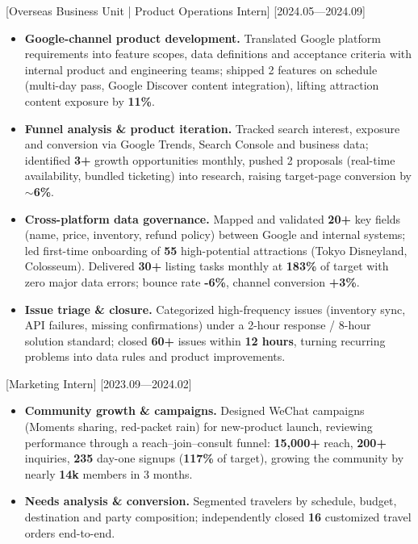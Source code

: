 \documentclass{resume}
\begin{document}
[\textnormal{Overseas Business Unit | Product Operations Intern}]
[2024.05—2024.09]

\begin{itemize}

\item \textbf{Google-channel product development.} Translated Google platform requirements into feature scopes, data definitions and acceptance criteria with internal product and engineering teams; shipped 2 features on schedule (multi-day pass, Google Discover content integration), lifting attraction content exposure by \textbf{11\%}.

\item \textbf{Funnel analysis \& product iteration.} Tracked search interest, exposure and conversion via Google Trends, Search Console and business data; identified \textbf{3+} growth opportunities monthly, pushed 2 proposals (real-time availability, bundled ticketing) into research, raising target-page conversion by \textbf{$\sim$6\%}.

\item \textbf{Cross-platform data governance.} Mapped and validated \textbf{20+} key fields (name, price, inventory, refund policy) between Google and internal systems; led first-time onboarding of \textbf{55} high-potential attractions (Tokyo Disneyland, Colosseum). Delivered \textbf{30+} listing tasks monthly at \textbf{183\%} of target with zero major data errors; bounce rate \textbf{-6\%}, channel conversion \textbf{+3\%}.

\item \textbf{Issue triage \& closure.} Categorized high-frequency issues (inventory sync, API failures, missing confirmations) under a 2-hour response / 8-hour solution standard; closed \textbf{60+} issues within \textbf{12 hours}, turning recurring problems into data rules and product improvements.

\end{itemize}

[\textnormal{Marketing Intern}]
[2023.09—2024.02]

\begin{itemize}

\item \textbf{Community growth \& campaigns.} Designed WeChat campaigns (Moments sharing, red-packet rain) for new-product launch, reviewing performance through a reach--join--consult funnel: \textbf{15,000+} reach, \textbf{200+} inquiries, \textbf{235} day-one signups (\textbf{117\%} of target), growing the community by nearly \textbf{14k} members in 3 months.

\item \textbf{Needs analysis \& conversion.} Segmented travelers by schedule, budget, destination and party composition; independently closed \textbf{16} customized travel orders end-to-end.

\end{itemize}
\end{document}
